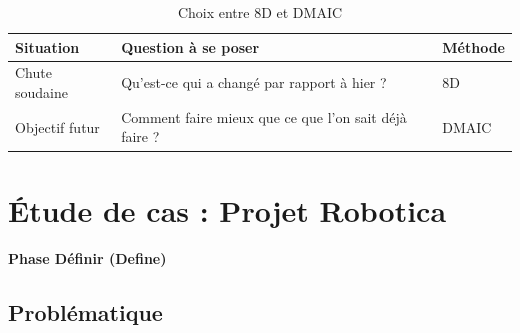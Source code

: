 \documentclass[11pt,a4paper]{article}
\newcommand{\subsectionbox}[1]{%
  \vspace{0.3em}
  \noindent\colorbox{secondcolor}{\parbox{\dimexpr\textwidth-2\fboxsep}{%
    \color{white}\large\bfseries #1%
  }}%
  \vspace{0.3em}
}
\begin{document}
\begin{table}[H]
\centering
\begin{tabular}{@{}lll@{}}
\toprule
\rowcolor{tableheader}
\color{white}\textbf{Situation} & \color{white}\textbf{Question à se poser} & \color{white}\textbf{Méthode} \\
\midrule
Chute soudaine & Qu'est-ce qui a changé par rapport à hier ? & 8D \\
\rowcolor{lightgray}
Objectif futur & Comment faire mieux que ce que l'on sait déjà faire ? & DMAIC \\
\bottomrule
\end{tabular}
\caption{Choix entre 8D et DMAIC}
\end{table}

\newpage
\section{Étude de cas : Projet Robotica}

\subsectionbox{Phase Définir (Define)}

\subsection{Problématique}
\end{document}
